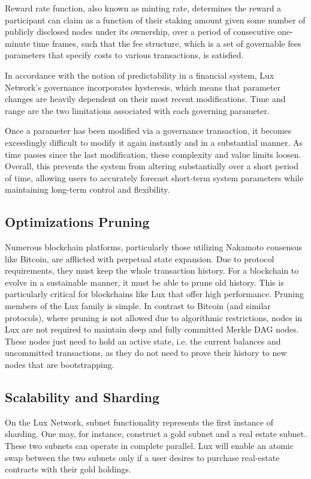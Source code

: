 \documentclass[11pt]{article}
\begin{document}
Reward rate function, also known as minting rate, determines the reward a participant can claim as a function of their staking amount given some number of publicly disclosed nodes under its ownership, over a period of consecutive one-minute time frames, such that the fee structure, which is a set of governable fees parameters that specify costs to various transactions, is satisfied.


In accordance with the notion of predictability in a financial system, Lux Network's governance incorporates hysteresis, which means that parameter changes are heavily dependent on their most recent modifications. Time and range are the two limitations associated with each governing parameter.


Once a parameter has been modified via a governance transaction, it becomes exceedingly difficult to modify it again instantly and in a substantial manner. As time passes since the last modification, these complexity and value limits loosen. Overall, this prevents the system from altering substantially over a short period of time, allowing users to accurately forecast short-term system parameters while maintaining long-term control and flexibility.


\subsection{Optimizations Pruning}

Numerous blockchain platforms, particularly those utilizing Nakamoto consensus like Bitcoin, are afflicted with perpetual state expansion. Due to protocol requirements, they must keep the whole transaction history. For a blockchain to evolve in a sustainable manner, it must be able to prune old history. This is particularly critical for blockchains like Lux that offer high performance. Pruning members of the Lux family is simple. In contrast to Bitcoin (and similar protocols), where pruning is not allowed due to algorithmic restrictions, nodes in Lux are not required to maintain deep and fully committed Merkle DAG nodes. These nodes just need to hold an active state, i.e. the current balances and uncommitted transactions, as they do not need to prove their history to new nodes that are bootstrapping.


\subsection{Scalability and Sharding}

On the Lux Network, subnet functionality represents the first instance of sharding. One may, for instance, construct a gold subnet and a real estate subnet. These two subnets can operate in complete parallel. Lux will enable an atomic swap between the two subnets only if a user desires to purchase real-estate contracts with their gold holdings.
\end{document}
